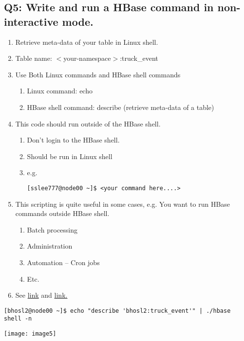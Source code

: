 \documentclass[]{article}
\begin{document}
\subsection*{Q5: Write and run a HBase command in non-interactive mode.} 
\begin{enumerate}[before=\itshape,font=\normalfont,label=\alph*.]
	\item Retrieve meta-data of your table in Linux shell.
	\item Table name: $<$your-namespace$>$:truck\_event
	\item Use Both Linux commands and HBase shell commands
	\begin{enumerate}[label=\roman*.]
		\item Linux command: echo
		\item HBase shell command: describe (retrieve meta-data of a table)
	\end{enumerate}
	\item This code should run outside of the HBase shell.
	\begin{enumerate}[label=\roman*.]
		\item Don’t login to the HBase shell.
		\item Should be run in Linux shell
		\item e.g.%
		{\normalfont 
			\begin{verbatim}
[sslee777@node00 ~]$ <your command here....>
			\end{verbatim} 
		}
	\end{enumerate}
	\item This scripting is quite useful in some cases, e.g. You want to run HBase commands outside HBase shell. 
	\begin{enumerate}[label=\roman*.]
		\item Batch processing
		\item Administration
		\item Automation – Cron jobs
		\item Etc.
	\end{enumerate}
	\item See \href{https://hbase.apache.org/book.html#_running_the_shell_in_non_interactive_mode}{link} and 
	\href{https://hbase.apache.org/book.html#hbase.shell.noninteractive}{link.}
\end{enumerate}

\begin{verbatim}
[bhosl2@node00 ~]$ echo "describe 'bhosl2:truck_event'" | ./hbase shell -n
\end{verbatim}

\texttt{[image: image5]} %
\end{document}
